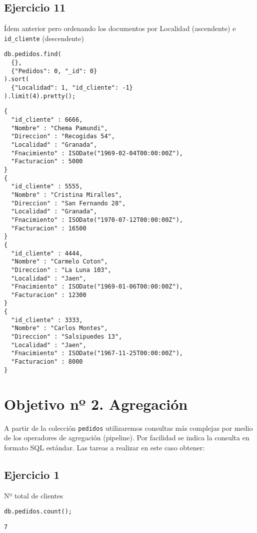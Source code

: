 \subsection{Ejercicio 11}

Ídem anterior pero ordenando los documentos por Localidad (ascendente) e \texttt{id\_cliente} (descendente)

\begin{lstlisting}
db.pedidos.find(
  {}, 
  {"Pedidos": 0, "_id": 0}
).sort(
  {"Localidad": 1, "id_cliente": -1}
).limit(4).pretty();
\end{lstlisting}

\begin{lstlisting}
{
  "id_cliente" : 6666,
  "Nombre" : "Chema Pamundi",
  "Direccion" : "Recogidas 54",
  "Localidad" : "Granada",
  "Fnacimiento" : ISODate("1969-02-04T00:00:00Z"),
  "Facturacion" : 5000
}
{
  "id_cliente" : 5555,
  "Nombre" : "Cristina Miralles",
  "Direccion" : "San Fernando 28",
  "Localidad" : "Granada",
  "Fnacimiento" : ISODate("1970-07-12T00:00:00Z"),
  "Facturacion" : 16500
}
{
  "id_cliente" : 4444,
  "Nombre" : "Carmelo Coton",
  "Direccion" : "La Luna 103",
  "Localidad" : "Jaen",
  "Fnacimiento" : ISODate("1969-01-06T00:00:00Z"),
  "Facturacion" : 12300
}
{
  "id_cliente" : 3333,
  "Nombre" : "Carlos Montes",
  "Direccion" : "Salsipuedes 13",
  "Localidad" : "Jaen",
  "Fnacimiento" : ISODate("1967-11-25T00:00:00Z"),
  "Facturacion" : 8000
}

\end{lstlisting}

\section{Objetivo nº 2. Agregación}

A partir de la colección \texttt{pedidos} utilizaremos consultas más complejas por medio de los operadores de agregación (pipeline). Por facilidad se indica la consulta en formato SQL estándar. Las tareas a realizar en este caso obtener:

\subsection{Ejercicio 1}

Nº total de clientes

\begin{lstlisting}
db.pedidos.count();
\end{lstlisting}

\begin{lstlisting}
7
\end{lstlisting}


